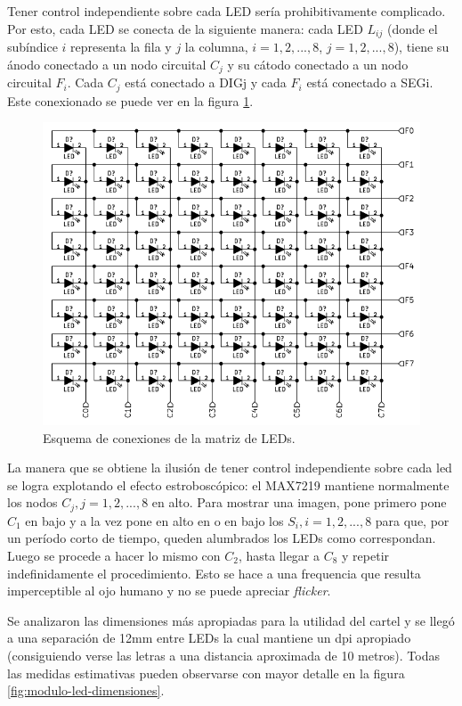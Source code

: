 Tener control independiente sobre cada LED sería prohibitivamente complicado. Por esto, cada LED se conecta de la siguiente manera: cada LED $L_{i j}$ (donde el subíndice $i$ representa la fila y $j$ la columna, $i=1, 2, ..., 8$, $j = 1,2, ..., 8$), tiene su ánodo conectado a un nodo circuital $C_j$ y su cátodo conectado a un nodo circuital $F_i$. Cada $C_j$ está conectado a DIGj y cada $F_i$ está conectado a SEGi. Este conexionado se puede ver en la figura \ref{fig:modulo-led}.

\begin{figure}[ht!]
	\centering
	\includegraphics[width=0.7\linewidth]{imagenes/hw/modulo-led.pdf}
	\caption{Esquema de conexiones de la matriz de LEDs.}
	\label{fig:modulo-led}
\end{figure}

La manera que se obtiene la ilusión de tener control independiente sobre cada led se logra explotando el efecto estroboscópico: el MAX7219 mantiene normalmente los nodos $C_j, j = 1, 2, ... ,8$ en alto. Para mostrar una imagen, pone primero pone $C_1$ en bajo y a la vez pone en alto en o en bajo los $S_i, i=1,2,...,8$ para que, por un período corto de tiempo, queden alumbrados los LEDs como correspondan. Luego se procede a hacer lo mismo con $C_2$, hasta llegar a $C_8$ y repetir indefinidamente el procedimiento. Esto se hace a una frequencia que resulta imperceptible al ojo humano y no se puede apreciar \emph{flicker}.

Se analizaron las dimensiones más apropiadas para la utilidad del cartel y se llegó a una separación de 12mm entre LEDs la cual mantiene un dpi apropiado (consiguiendo verse las letras a una distancia aproximada de 10 metros). 
Todas las medidas estimativas pueden observarse con mayor detalle en la figura \ref{fig:modulo-led-dimensiones}.

